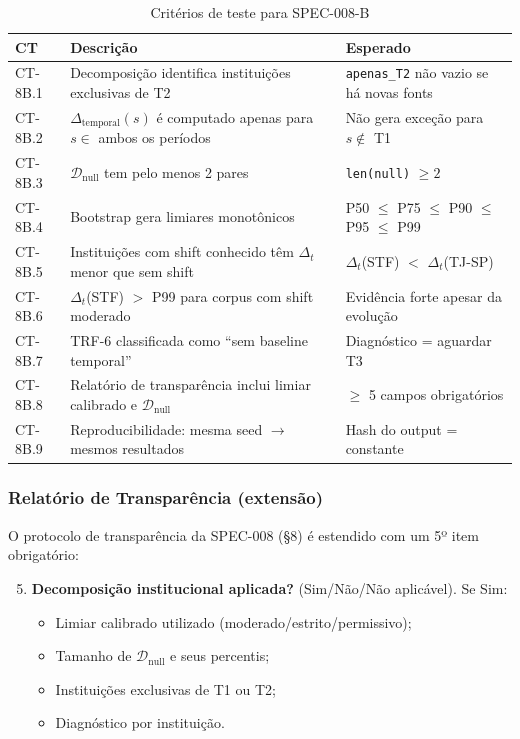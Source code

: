 \documentclass[12pt,a4paper]{article}
\theoremstyle{remark}
\begin{document}
\begin{table}[H]\centering\footnotesize
\caption{Critérios de teste para SPEC-008-B}
\label{tab:cts}
\begin{tabular}{p{}p{}p{}}
\toprule
\textbf{CT} & \textbf{Descrição} & \textbf{Esperado} \\
\midrule
CT-8B.1 & Decomposição identifica instituições exclusivas de T2 & \texttt{apenas\_T2} não vazio se há novas fonts \\
CT-8B.2 & $\Delta_{\text{temporal}}(s)$ é computado apenas para $s \in$ ambos os períodos & Não gera exceção para $s \notin$ T1 \\
CT-8B.3 & $\mathcal{D}_{\text{null}}$ tem pelo menos 2 pares & \texttt{len(null)} $\geq 2$ \\
CT-8B.4 & Bootstrap gera limiares monotônicos & P50 $\leq$ P75 $\leq$ P90 $\leq$ P95 $\leq$ P99 \\
CT-8B.5 & Instituições com shift conhecido têm $\Delta_t$ menor que sem shift & $\Delta_t$(STF) $<$ $\Delta_t$(TJ-SP) \\
CT-8B.6 & $\Delta_t$(STF) $>$ P99 para corpus com shift moderado & Evidência forte apesar da evolução \\
CT-8B.7 & TRF-6 classificada como ``sem baseline temporal'' & Diagnóstico = aguardar T3 \\
CT-8B.8 & Relatório de transparência inclui limiar calibrado e $\mathcal{D}_{\text{null}}$ & $\geq$ 5 campos obrigatórios \\
CT-8B.9 & Reproducibilidade: mesma seed $\to$ mesmos resultados & Hash do output = constante \\
\bottomrule
\end{tabular}
\end{table}

\subsubsection{Relatório de Transparência (extensão)}

O protocolo de transparência da SPEC-008 (§8) é estendido com um 5º item obrigatório:

\begin{enumerate}[nosep]
  \setcounter{enumi}{4}
  \item \textbf{Decomposição institucional aplicada?} (Sim/Não/Não aplicável). Se Sim:
  \begin{itemize}[nosep]
    \item Limiar calibrado utilizado (moderado/estrito/permissivo);
    \item Tamanho de $\mathcal{D}_{\text{null}}$ e seus percentis;
    \item Instituições exclusivas de T1 ou T2;
    \item Diagnóstico por instituição.
  \end{itemize}
\end{enumerate}
\end{document}
